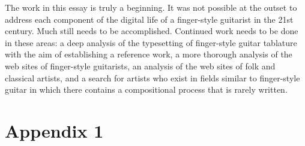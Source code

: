 \documentclass[unicode,hyperfootnotes=false,xetex,colorlinks=true,nofonts,nobib]{tufte-handout}
\begin{document}
The work in this essay is truly a beginning. It was not possible at the outset to address each component of the digital life of a finger-style guitarist in the 21st century. Much still needs to be accomplished. Continued work needs to be done in these areas: a deep analysis of the typesetting of finger-style guitar tablature with the aim of establishing a reference work, a more thorough analysis of the web sites of finger-style guitarists, an analysis of the web sites of folk and classical artists, and a search for artists who exist in fields similar to finger-style guitar in which there contains a compositional process that is rarely written.

\nocite{alexAnderson,alexDeGrassi,andrewWhite,andyMcKee,billyMcLaughlin,adamRafferty,calumGraham,cliveCarroll,craigDAndrea,evaAtmatzidou,ewanDobson,garethPearson,happyTraum,ianEthanCase,janetFeder,jimmyWahlsteen,jonGomm,kakiKing,kellyValleau,kevinHorrigan,leoKottke,lucaStricagnoli,lucasMich,masaakiKishibe,michaelChap,michaelGul,mikeDawes,murielAnders,peppino,peterCiluzzi,peterFinger,pierre,rayMontford,pino,spencerElliot,sunghaJung,thomasLeeb,timSparks,tommyEmmanuel,trevorGH,vickiGenfan}
% 
% 
\printbibliography
\clearpage

\section{Appendix 1}
\label{sec:appendix-1}
\end{document}
